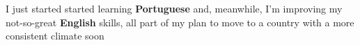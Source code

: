     {I just started started learning \textbf{Portuguese} and, meanwhile, I'm improving my not-so-great \textbf{English} skills, all part of my plan to move to a country with a more consistent climate soon}
